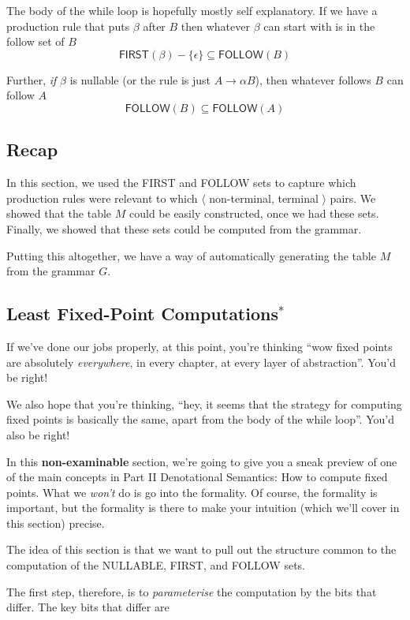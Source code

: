 The body of the while loop is hopefully mostly self explanatory. If we have a production rule that puts $\beta$ after $B$ then whatever $\beta$ can start with is in the follow set of $B$
\[\textsf{FIRST}(\beta) - \{\epsilon\} \subseteq \textsf{FOLLOW}(B)\]

Further, \textit{if} $\beta$ is nullable (or the rule is just $A \to \alpha B$), then whatever follows $B$ can follow $A$
\[\textsf{FOLLOW}(B) \subseteq \textsf{FOLLOW}(A)\]

\subsection{Recap}
In this section, we used the \textsf{FIRST} and \textsf{FOLLOW} sets to capture which production rules were relevant to which $\langle$ non-terminal, terminal $\rangle$ pairs. We showed that the table $M$ could be easily constructed, once we had these sets. Finally, we showed that these sets could be computed from the grammar. 

Putting this altogether, we have a way of automatically generating the table $M$ from the grammar $G$.

\subsection{Least Fixed-Point Computations$^*$}\label{section:fixed-point-computations}
If we've done our jobs properly, at this point, you're thinking ``wow fixed points are absolutely \textit{everywhere}, in every chapter, at every layer of abstraction''. You'd be right!

We also hope that you're thinking, ``hey, it seems that the strategy for computing fixed points is basically the same, apart from the body of the while loop''. You'd also be right!

In this \textsf{\textbf{non-examinable}} section, we're going to give you a sneak preview of one of the main concepts in \textsf{Part II Denotational Semantics}: How to compute fixed points. What we \textit{won't} do is go into the formality. Of course, the formality is important, but the formality is there to make your intuition (which we'll cover in this section) precise.

The idea of this section is that we want to pull out the structure common to the computation of the \textsf{NULLABLE}, \textsf{FIRST}, and \textsf{FOLLOW} sets. 

The first step, therefore, is to \textit{parameterise} the computation by the bits that differ. The key bits that differ are 

